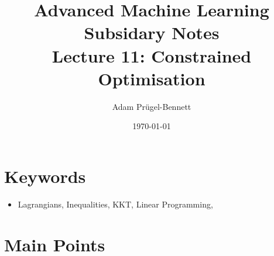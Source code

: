 \documentclass[11pt]{article}
\author{Adam Prügel-Bennett}
\date{\today}
\title{Advanced Machine Learning Subsidary Notes\\\medskip
\large Lecture 11: Constrained Optimisation}
\begin{document}
\maketitle

\section{Keywords}
\label{sec:orgfede038}
\begin{itemize}
\item Lagrangians, Inequalities, KKT, Linear Programming,
\end{itemize}

\section{Main Points}
\label{sec:orgc9f8acd}
\end{document}
